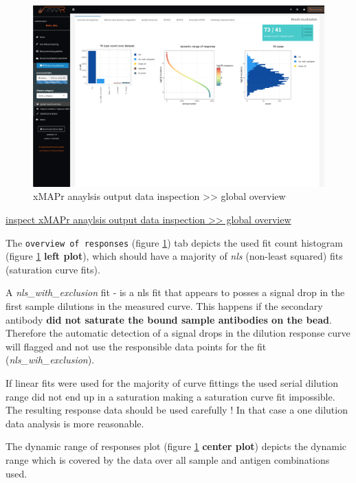 \documentclass[]{book}
\theoremstyle{definition}
\theoremstyle{definition}
\theoremstyle{definition}
\theoremstyle{remark}
\begin{document}
\begin{figure}

{\centering \includegraphics[width=50.5in]{figures/global_result_overview} 

}

\caption{xMAPr anaylsis output data inspection >> global overview}\label{fig:globalResultOverview}
\end{figure}

\href{figures/global_result_overview.png}{inspect xMAPr anaylsis output
data inspection \textgreater{}\textgreater{} global overview}

The \texttt{overview\ of\ responses} (figure
\ref{fig:globalResultOverview}) tab depicts the used fit count histogram
(figure \ref{fig:globalResultOverview} \textbf{left plot}), which should
have a majority of \emph{nls} (non-least squared) fits (saturation curve
fits).

A \emph{nls\_with\_exclusion} fit - is a nls fit that appears to posses
a signal drop in the first sample dilutions in the measured curve. This
happens if the secondary antibody \textbf{did not saturate the bound
sample antibodies on the bead}. Therefore the automatic detection of a
signal drops in the dilution response curve will flagged and not use the
responsible data points for the fit (\emph{nls\_wih\_exclusion}).

If linear fits were used for the majority of curve fittings the used
serial dilution range did not end up in a saturation making a saturation
curve fit impossible. The resulting response data should be used
carefully ! In that case a one dilution data analysis is more
reasonable.

The dynamic range of responses plot (figure
\ref{fig:globalResultOverview} \textbf{center plot}) depicts the dynamic
range which is covered by the data over all sample and antigen
combinations used.
\end{document}
